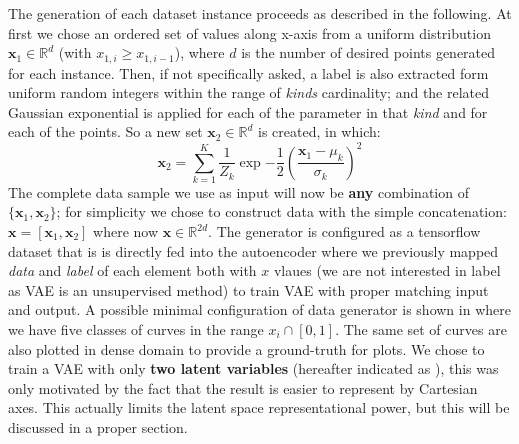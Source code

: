 %
The generation of each dataset instance proceeds as described in the following. At first we chose an ordered set of values along x-axis from a uniform distribution $\bm{x}_1 \in \mathbb{R}^{d}$ (with $x_{1,i} \geq x_{1,i-1}$), where $d$ is the number of desired points generated for each instance. Then, if not specifically asked, a label is also extracted form uniform random integers within the range of \textit{kinds} cardinality; and the related Gaussian exponential is applied for each of the parameter in that \textit{kind} and for each of the points. So a new set $\bm{x}_2 \in \mathbb{R}^d$ is created, in which:
\begin{equation}
    \bm{x}_2 = \sum_{k=1}^K \frac{1}{Z_k} \exp{-\frac{1}{2}\left( \frac{\bm{x}_1-\mu_k}{\sigma_k}\right)^2}
\end{equation}
The complete data sample we use as input will now be \textbf{any} combination of $\{\bm{x}_1, \bm{x}_2\}$; for simplicity we chose to construct data with the simple concatenation: $\bm{x} = [\bm{x}_1, \bm{x}_2]$ where now $\bm{x} \in \mathbb{R}^{2d}$.
The generator is configured as a tensorflow dataset that is is directly fed into the autoencoder where we previously mapped \textit{data} and \textit{label} of each element both with $x$ vlaues (we are not interested in label as VAE is an unsupervised method) to train \acs{VAE} with proper matching input and output.
A possible minimal configuration of data generator is shown in \Figure{\ref{fig:sum_of_gaussians}} where we have five classes of curves in the range $x_i \cap [0,1]$. The same set of curves are also plotted in dense domain to provide a ground-truth for plots. We chose to train a \acs{VAE} with only \textbf{two latent variables} (hereafter indicated as ), this was only motivated by the fact that the result is easier to represent by Cartesian axes. This actually limits the latent space representational power, but this will be discussed in a proper section.
%

